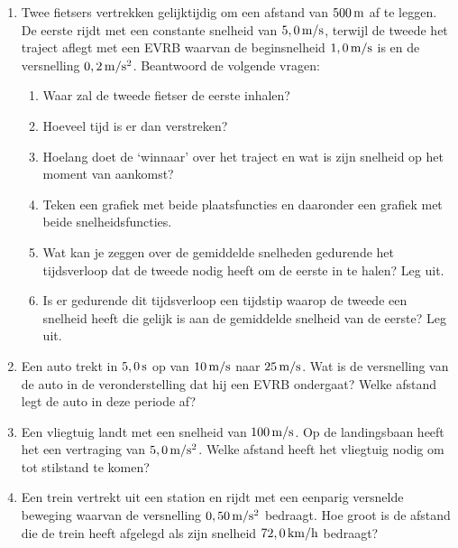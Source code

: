\begin{enumerate}
\item Twee fietsers vertrekken gelijktijdig om een afstand van $500\rm\,m$ af te leggen. De eerste rijdt met een constante snelheid van $5,0\rm\,m/s$, terwijl de tweede het traject aflegt met een EVRB waarvan de beginsnelheid $1,0\rm\,m/s$ is en de versnelling $0,2\rm\,m/s^2$. Beantwoord de volgende vragen:
\begin{enumerate}
\item Waar zal de tweede fietser de eerste inhalen? 
\item Hoeveel tijd is er dan verstreken? 
\item Hoelang doet de `winnaar' over het traject en wat is zijn snelheid op het moment van aankomst?
\item Teken een grafiek met beide plaatsfuncties en daaronder een grafiek met beide snelheidsfuncties. 
\item Wat kan je zeggen over de gemiddelde snelheden gedurende het tijdsverloop dat de tweede nodig heeft om de eerste in te halen? Leg uit.
\item Is er gedurende dit tijdsverloop een tijdstip waarop de tweede een snelheid heeft die gelijk is aan de
gemiddelde snelheid van de eerste? Leg uit.
\end{enumerate}

\item Een auto trekt in $5,0\rm\,s$ op van $10\rm\,m/s$ naar $25\rm\,m/s$. Wat is de versnelling van de auto in de veronderstelling dat hij een EVRB ondergaat? Welke afstand legt de auto in deze periode af?

\item Een vliegtuig landt met een snelheid van $100\rm\,m/s$. Op de landingsbaan heeft het een vertraging van $5,0\rm\,m/s^2$. Welke afstand heeft het vliegtuig nodig om tot stilstand te komen? %

\item Een trein vertrekt uit een station en rijdt met een eenparig versnelde beweging waarvan de versnelling $0,50\rm\,m/s^2$ bedraagt. Hoe groot is de afstand die de trein heeft afgelegd als zijn snelheid $72,0\rm\,km/h$ bedraagt?


\end{enumerate}
